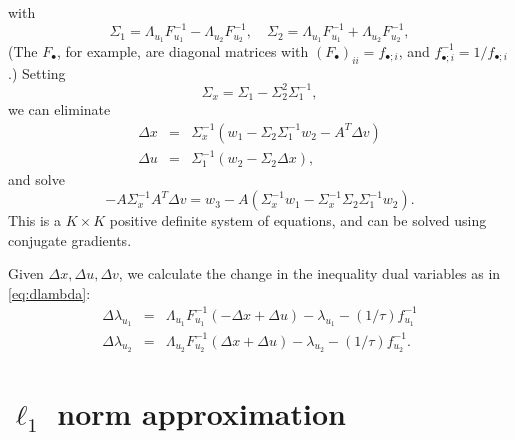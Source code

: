 \documentclass{article}
\newcommand{\dx}{\Delta x}
\newcommand{\du}{\Delta u}
\newcommand{\dv}{\Delta v}
\newcommand{\dlam}{\Delta\lambda}
\newcommand{\<}{\langle}
\renewcommand{\>}{\rangle}
\begin{document}
with
\[
\Sigma_1 = \Lambda_{u_1} F^{-1}_{u_1} - \Lambda_{u_2} F^{-1}_{u_2}, \quad
\Sigma_2 = \Lambda_{u_1} F^{-1}_{u_1} + \Lambda_{u_2} F^{-1}_{u_2},
\]
(The $F_\bullet$, for example, are diagonal matrices with $(F_\bullet)_{ii} = f_{\bullet;i}$, and $f^{-1}_{\bullet;i} = 1/f_{\bullet;i}$.)
Setting
\[
\Sigma_x = \Sigma_1 - \Sigma_2^2\Sigma_1^{-1},
\]
we can eliminate 
\begin{eqnarray*}
\dx & = & \Sigma_x^{-1}(w_1 - \Sigma_2\Sigma_1^{-1}w_2 - A^T\dv)\\
\du & = & \Sigma_1^{-1}(w_2 - \Sigma_2\dx),
\end{eqnarray*}
and solve
\[
-A\Sigma_x^{-1}A^T\dv =  w_3 - A(\Sigma_x^{-1}w_1 - \Sigma_x^{-1}\Sigma_2\Sigma_1^{-1}w_2).
\]
This is a $K\times K$ positive definite system of equations, and can be solved using conjugate gradients.

Given $\dx,\du,\dv$, we calculate the change in the inequality dual variables as in \eqref{eq:dlambda}:
\begin{eqnarray*}
\dlam_{u_1}  & = & \Lambda_{u_1} F^{-1}_{u_1}(-\dx + \du) - \lambda_{u_1}  - (1/\tau)f^{-1}_{u_1} \\
\dlam_{u_2} & = & \Lambda_{u_2} F^{-1}_{u_2}(\dx+\du) - \lambda_{u_2} - (1/\tau)f^{-1}_{u_2}. 
\end{eqnarray*}


\section{$\ell_1$ norm approximation}
\label{sec:l1approx}
\end{document}
